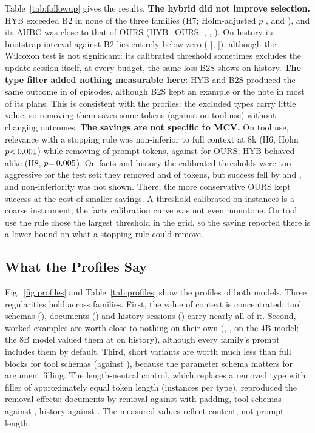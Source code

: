 Table~\ref{tab:followup} gives the results. \textbf{The hybrid did not improve selection.} HYB exceeded B2 in none of the
three families (H7; Holm-adjusted $p$ \RHSevenFactsP, \RHSevenHistoryP and \RHSevenToolP), and its AUBC was close to that of OURS
(HYB$-$OURS: \RHybVsOursFacts, \RHybVsOursHistory, \RHybVsOursTool). On history its bootstrap interval against B2 lies
entirely below zero (\RHSevenHistoryDiff{} [\RHSevenHistoryLo, \RHSevenHistoryHi]), although the Wilcoxon test is not
significant: its calibrated threshold sometimes excludes the update session itself, at every budget, the same loss
B2S shows on history. \textbf{The type filter added nothing measurable here:} HYB and
B2S produced the same outcome in \RHybStopSame of episodes, although B2S kept an example or the note in most of its plans. This
is consistent with the profiles: the excluded types carry little value, so removing them saves some tokens
(\RTokCutHybTool against \RTokCutStopTool on tool use) without changing outcomes. \textbf{The savings are not specific to MCV.} On tool use,
relevance with a stopping rule was non-inferior to full context at 8k (H6, Holm $p{<}\,0.001$) while removing
\RTokCutStopTool of prompt tokens, against \RTokCutTool for OURS; HYB behaved alike (H8, $p{=}\,0.005$). On facts and
history the calibrated thresholds were too aggressive for the test set: they removed \RTokCutStopFacts and
\RTokCutStopHistory of tokens, but success fell by \RHSixFactsDiff{} and \RHSixHistoryDiff{}, and non-inferiority was not
shown. There, the more conservative OURS kept success at the cost of smaller savings. A threshold calibrated on
\RNCalib instances is a coarse instrument; the facts calibration curve was not even monotone. On tool use the rule chose the
largest threshold in the grid, so the saving reported there is a lower bound on what a stopping rule could remove.

\subsection{What the Profiles Say}
Fig.~\ref{fig:profiles} and Table~\ref{tab:profiles} show the profiles of both models. Three regularities hold across families. First,
the value of context is concentrated: tool schemas (\RMcvToolToolSchema), documents (\RMcvFactsFact) and history
sessions (\RMcvHistoryHistoryTurn) carry nearly all of it. Second, worked examples are worth close to nothing
on their own (\RMcvFactsExample, \RMcvHistoryExample, \RMcvToolExample on the 4B model; the 8B model valued them
at \RMcvEightHistoryExample on history), although every family's prompt includes them by default. Third, short variants are worth much less than full blocks for tool schemas
(\RShortToolToolSchema against \RMcvToolToolSchema), because the parameter schema matters for argument filling.
The length-neutral control, which replaces a removed type with filler of approximately equal token length (\RPadN instances per
type), reproduced the removal effects: documents \RRemFactsFact by removal against \RPadFactsFact with padding, tool
schemas \RRemToolToolSchema against \RPadToolToolSchema, history \RRemHistoryHistoryTurn against
\RPadHistoryHistoryTurn. The measured values reflect content, not prompt length.


